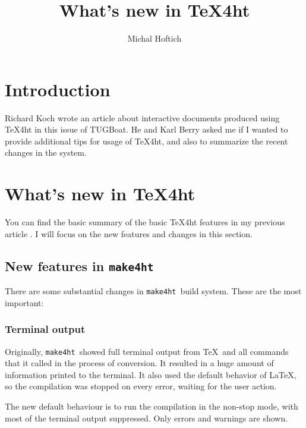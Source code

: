 \documentclass{ltugboat}
\title{What's new in \TeX4ht}
\author{Michal Hoftich}
\newcommand\makefourht{\texttt{make4ht}}
\begin{document}
\maketitle

\begin{abstract}
\end{abstract}

\section{Introduction}

Richard Koch wrote an article about interactive documents produced using
\TeX4ht in this issue of TUGBoat. He and Karl Berry asked me if I wanted 
to provide additional tips for usage of \TeX4ht, and also to summarize
the recent changes in the system.


\hypertarget{Whatux27sux20newux20inux20TeX4ht}{%
\section{What's new in TeX4ht}\label{Whatux27sux20newux20inux20TeX4ht}}

You can find the basic summary of the basic \TeX4ht features in my previous article
\cite{hoftich19}. I will focus on the new features and changes in this section.

\subsection{New features in \makefourht}

There are some substantial changes in \makefourht\ build system. These are the
most important:

\subsubsection{Terminal output}

Originally, \makefourht\ showed full terminal output from \TeX\ and all
commands that it called in the process of conversion. It resulted in a huge 
amount of information printed to the terminal. It also used the default 
behavior of \LaTeX, so the compilation was stopped on every error, waiting
for the user action.

The new default behaviour is to run the compilation in the non-stop mode, 
with most of the terminal output suppressed. Only errors and warnings are 
shown. 
\end{document}
